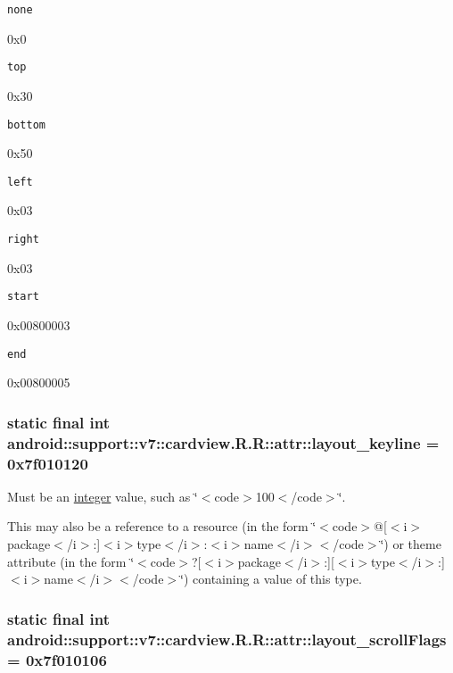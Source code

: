 {\tt none}

0x0

{\tt top}

0x30

{\tt bottom}

0x50

{\tt left}

0x03

{\tt right}

0x03

{\tt start}

0x00800003

{\tt end}

0x00800005\hypertarget{classandroid_1_1support_1_1v7_1_1cardview_1_1_r_1_1attr_f2f93bdcc0c8d3b7ffe6163df6bc4a13}{
\subsubsection[{layout\_\-keyline}]{\setlength{\rightskip}{0pt plus 5cm}static final int android::support::v7::cardview.R.R::attr::layout\_\-keyline = 0x7f010120}}
\label{classandroid_1_1support_1_1v7_1_1cardview_1_1_r_1_1attr_f2f93bdcc0c8d3b7ffe6163df6bc4a13}


Must be an \hyperlink{classandroid_1_1support_1_1v7_1_1cardview_1_1_r_1_1integer}{integer} value, such as \char`\"{}$<$code$>$100$<$/code$>$\char`\"{}. 

This may also be a reference to a resource (in the form \char`\"{}$<$code$>$@\mbox{[}$<$i$>$package$<$/i$>$:\mbox{]}$<$i$>$type$<$/i$>$:$<$i$>$name$<$/i$>$$<$/code$>$\char`\"{}) or theme attribute (in the form \char`\"{}$<$code$>$?\mbox{[}$<$i$>$package$<$/i$>$:\mbox{]}\mbox{[}$<$i$>$type$<$/i$>$:\mbox{]}$<$i$>$name$<$/i$>$$<$/code$>$\char`\"{}) containing a value of this type. \hypertarget{classandroid_1_1support_1_1v7_1_1cardview_1_1_r_1_1attr_bffb0d3f8add1f1e367a6d3caf2743bc}{
\subsubsection[{layout\_\-scrollFlags}]{\setlength{\rightskip}{0pt plus 5cm}static final int android::support::v7::cardview.R.R::attr::layout\_\-scrollFlags = 0x7f010106}}
\label{classandroid_1_1support_1_1v7_1_1cardview_1_1_r_1_1attr_bffb0d3f8add1f1e367a6d3caf2743bc}


